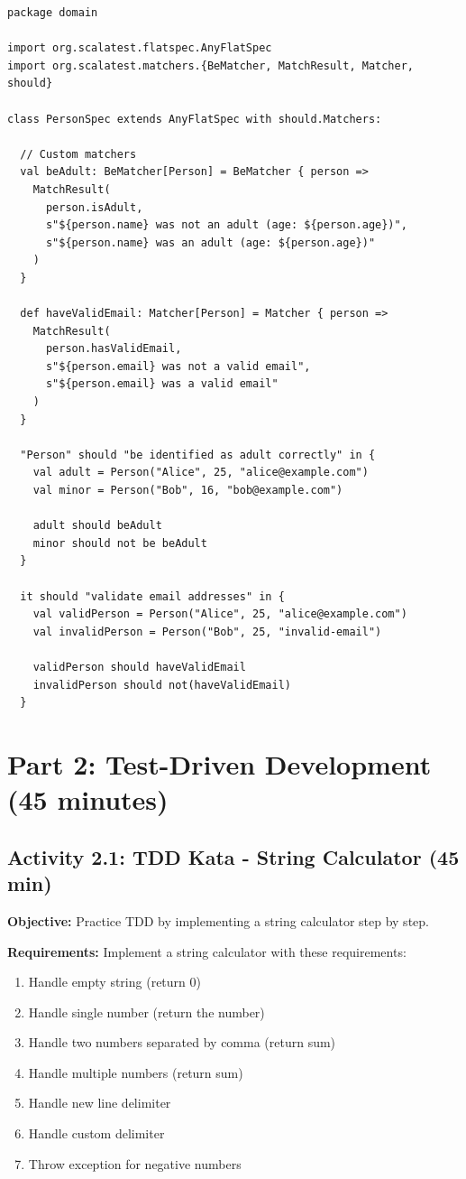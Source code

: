 \documentclass[12pt,a4paper]{article}
\begin{document}
\begin{lstlisting}
package domain

import org.scalatest.flatspec.AnyFlatSpec
import org.scalatest.matchers.{BeMatcher, MatchResult, Matcher, should}

class PersonSpec extends AnyFlatSpec with should.Matchers:
  
  // Custom matchers
  val beAdult: BeMatcher[Person] = BeMatcher { person =>
    MatchResult(
      person.isAdult,
      s"${person.name} was not an adult (age: ${person.age})",
      s"${person.name} was an adult (age: ${person.age})"
    )
  }
  
  def haveValidEmail: Matcher[Person] = Matcher { person =>
    MatchResult(
      person.hasValidEmail,
      s"${person.email} was not a valid email",
      s"${person.email} was a valid email"
    )
  }
  
  "Person" should "be identified as adult correctly" in {
    val adult = Person("Alice", 25, "alice@example.com")
    val minor = Person("Bob", 16, "bob@example.com")
    
    adult should beAdult
    minor should not be beAdult
  }
  
  it should "validate email addresses" in {
    val validPerson = Person("Alice", 25, "alice@example.com")
    val invalidPerson = Person("Bob", 25, "invalid-email")
    
    validPerson should haveValidEmail
    invalidPerson should not(haveValidEmail)
  }
\end{lstlisting}

\section{Part 2: Test-Driven Development (45 minutes)}

\subsection{Activity 2.1: TDD Kata - String Calculator (45 min)}

\textbf{Objective:} Practice TDD by implementing a string calculator step by step.

\textbf{Requirements:} Implement a string calculator with these requirements:
\begin{enumerate}
  \item Handle empty string (return 0)
  \item Handle single number (return the number)
  \item Handle two numbers separated by comma (return sum)
  \item Handle multiple numbers (return sum)
  \item Handle new line delimiter
  \item Handle custom delimiter
  \item Throw exception for negative numbers
\end{enumerate}
\end{document}
